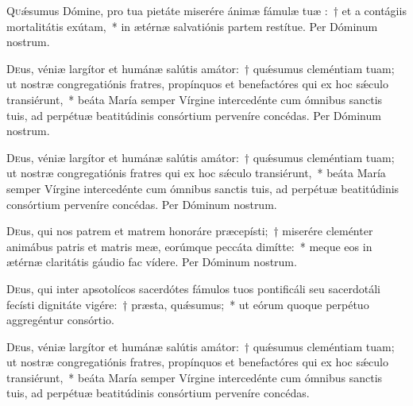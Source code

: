 \documentclass[vesperale_romanum]{subfiles}
\begin{document}

\lettrine[depth=1]{Q}{u}ǽsumus Dómine, pro tua pietáte miserére ánimæ fámulæ tuæ \nomen{}:~† et a contágiis mortalitátis exútam,~* in ætérnæ salvatiónis partem restítue. 
Per Dóminum nostrum.


\lettrine{D}{e}us, véniæ largítor et humánæ salútis amátor:~† quǽsumus cleméntiam tuam; 
ut nostræ congregatiónis fratres, propínquos et benefactóres qui ex hoc sǽculo transiérunt,~* beáta María semper
Vírgine intercedénte cum ómnibus sanctis tuis, ad perpétuæ beatitúdinis consórtium perveníre concédas. Per Dóminum nostrum.


\lettrine{D}{e}us, véniæ largítor et humánæ salútis amátor:~† quǽsumus cleméntiam tuam; 
ut nostræ congregatiónis fratres qui ex hoc sǽculo transiérunt,~* beáta María semper Vírgine intercedénte cum ómnibus sanctis tuis,
 ad perpétuæ beatitúdinis consórtium perveníre concédas. Per Dóminum nostrum.


\lettrine{D}{e}us, qui nos patrem et matrem honoráre præcepísti;~† miserére cleménter animábus patris et matris meæ,
 eorúmque peccáta dimítte:~* meque eos in ætérnæ claritátis gáudio fac vídere. 
Per Dóminum nostrum.





\lettrine{D}{e}us, qui inter apsotolícos sacerdótes fámulos tuos pontificáli seu sacerdotáli fecísti dignitáte vigére:~† præsta, quǽsumus;~* ut eórum quoque perpétuo  aggregéntur consórtio. 

\lettrine{D}{e}us, véniæ largítor et humánæ salútis amátor:~† quǽsumus cleméntiam tuam; 
ut nostræ congregatiónis fratres, propínquos et benefactóres qui ex hoc sǽculo transiérunt,~* beáta María semper Vírgine intercedénte cum ómnibus sanctis tuis, ad perpétuæ beatitúdinis consórtium perveníre concédas.
\end{document}
